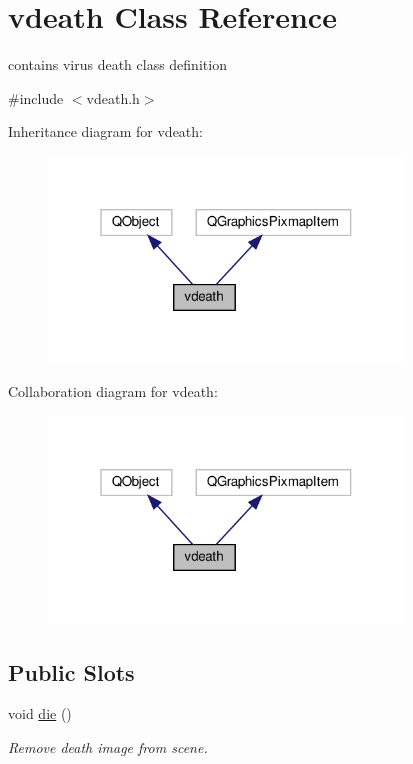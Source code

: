 \hypertarget{classvdeath}{}\section{vdeath Class Reference}
\label{classvdeath}


contains virus death class definition  




{\ttfamily \#include $<$vdeath.\+h$>$}



Inheritance diagram for vdeath\+:\nopagebreak
\begin{figure}[H]
\begin{center}
\leavevmode
\includegraphics[width=268pt]{classvdeath__inherit__graph}
\end{center}
\end{figure}


Collaboration diagram for vdeath\+:\nopagebreak
\begin{figure}[H]
\begin{center}
\leavevmode
\includegraphics[width=268pt]{classvdeath__coll__graph}
\end{center}
\end{figure}
\subsection*{Public Slots}
\begin{DoxyCompactItemize}
\item 
void \hyperlink{classvdeath_a36a74d88a906688ff06503b61c57b670}{die} ()
\begin{DoxyCompactList}\small\item\em Remove death image from scene. \end{DoxyCompactList}\end{DoxyCompactItemize}
